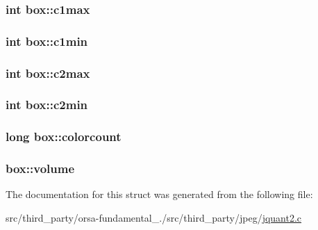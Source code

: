 \subsubsection[{c1max}]{\setlength{\rightskip}{0pt plus 5cm}int box\+::c1max}\label{structbox_a5313694dbee838c7f4d5f409e954460e}
\hypertarget{structbox_a81563b63e4a79ca40bdfeacf5070a6d9}{}
\subsubsection[{c1min}]{\setlength{\rightskip}{0pt plus 5cm}int box\+::c1min}\label{structbox_a81563b63e4a79ca40bdfeacf5070a6d9}
\hypertarget{structbox_a1fe5b5ab81ed7e8e3f104deb168576cd}{}
\subsubsection[{c2max}]{\setlength{\rightskip}{0pt plus 5cm}int box\+::c2max}\label{structbox_a1fe5b5ab81ed7e8e3f104deb168576cd}
\hypertarget{structbox_a781a101c49c5e4a789967569994d924d}{}
\subsubsection[{c2min}]{\setlength{\rightskip}{0pt plus 5cm}int box\+::c2min}\label{structbox_a781a101c49c5e4a789967569994d924d}
\hypertarget{structbox_af92a3080724bf452855f631e901b803c}{}
\subsubsection[{colorcount}]{\setlength{\rightskip}{0pt plus 5cm}long box\+::colorcount}\label{structbox_af92a3080724bf452855f631e901b803c}
\hypertarget{structbox_acaba83fb8356e20d21793c23c41033a1}{}
\subsubsection[{volume}]{ box\+::volume}\label{structbox_acaba83fb8356e20d21793c23c41033a1}


The documentation for this struct was generated from the following file\+:\begin{DoxyCompactItemize}
\item 
src/third\+\_\+party/orsa-\/fundamental\+\_./src/third\+\_\+party/jpeg/\hyperlink{jquant2_8c}{jquant2.\+c}\end{DoxyCompactItemize}
